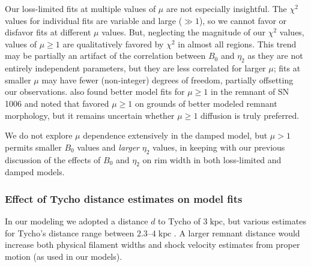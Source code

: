\documentclass[iop, apj, numberedappendix]{emulateapj}
\newcommand*{\mt}{\mathrm}
\newcommand*{\unit}[1]{\;\mt{#1}}  %
\begin{document}
Our loss-limited fits at multiple values of $\mu$ are not especially
insightful.  The $\chi^2$ values for individual fits are variable and large
($\gg 1$), so we cannot favor or disfavor fits at different $\mu$ values.  But,
neglecting the magnitude of our $\chi^2$ values, values of $\mu \geq 1$ are
qualitatively favored by $\chi^2$ in almost all regions.  This trend may be
partially an artifact of the correlation between $B_0$ and $\eta_2$ as they are
not entirely independent parameters, but they are less correlated for larger
$\mu$; fits at smaller $\mu$ may have fewer (non-integer) degrees of freedom,
partially offsetting our observations.   also found
better model fits for $\mu \geq 1$ in the remnant of SN 1006 and noted that
\citet{reynolds2004} favored $\mu \geq 1$ on grounds of better modeled remnant
morphology, but it remains uncertain whether $\mu \geq 1$ diffusion is truly
preferred.

We do not explore $\mu$ dependence extensively in the damped model, but
$\mu > 1$ permits smaller $B_0$ values and \emph{larger} $\eta_2$ values, in
keeping with our previous discussion of the effects of $B_0$ and $\eta_2$ on
rim width in both loss-limited and damped models.

\subsubsection{Effect of Tycho distance estimates on model fits}

In our modeling we adopted a distance $d$ to Tycho of $3 \unit{kpc}$, but
various estimates for Tycho's distance range between $2.3$--$4 \unit{kpc}$
\citep{hayato2010}.  A larger remnant distance would increase both physical
filament widths and shock velocity estimates from proper motion (as used in our
models).
\end{document}
